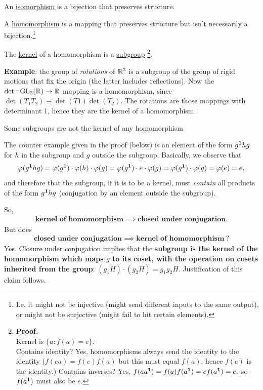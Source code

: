 An \underline{isomorphism} is a bijection that preserves structure.

A \underline{homomorphism} is a mapping that preserves structure but isn't
necessarily a bijection.\footnote{I.e. it might not be injective (might send
  different inputs to the same output), or might not be surjective (might fail
  to hit certain elements).}

\begin{theorem}
The \underline{kernel} of a homomorphism is a \underline{subgroup} \footnote{\textbf{Proof.}\\Kernel
  is $\{a:f(a) = e\}$.\\
Contains identity? Yes, homomorphisms always send the identity to the identity
($f(ea) = f(e)f(a)$ but this must equal $f(a)$, hence $f(e)$ is the identity.)
Contains inverses? Yes, $f(aa^{\mathbf 1}) = f(a)f(a^{\mathbf 1}) = ef(a^{\mathbf 1}) = e$, so $f(a^{\mathbf 1})$ must also be $e$.}.
\end{theorem}

\textbf{Example}: the group of \emph{rotations} of $\mathbb{R}^3$ is a subgroup of the
group of rigid motions that fix the origin (the latter includes
reflections). Now the $\det:\mathrm{GL}_{3}(\mathbb{R}) \to \mathbb{R}$ mapping is a homomorphism, since
$\det(T_1T_2) \equiv \det(T1)\det(T_2)$. The rotations are those mappings with
determinant 1, hence they are the kernel of a homomorphism.

\begin{theorem}
Some subgroups are not the kernel of any homomorphism
\end{theorem}

The counter example given in the proof (below) is an element of the form
$g^{\mathbf 1}hg$ for $h$ in the subgroup and $g$ outside the subgroup. Basically, we
observe that
\begin{align*}
\varphi(g^{\mathbf 1}hg) =
\varphi(g^{\mathbf 1})\cdot\varphi(h)\cdot \varphi(g) =
\varphi(g^{\mathbf 1})\cdot e\cdot\varphi(g) =
\varphi(g^{\mathbf 1})\cdot \varphi(g) =
\varphi(e) =
e,
\end{align*}
and therefore that the subgroup, if it is to be a kernel, must \emph{contain}
all products of the form $g^{\mathbf 1}hg$ (conjugation by an element outside the
subgroup).

So,
\begin{align*}
  \textbf{kernel of homomorphism} \implies \textbf{closed under conjugation}.
\end{align*}
But does
\begin{align*}
  \textbf{closed under conjugation} \implies \textbf{kernel of homomorphism} ~ ?
\end{align*}
Yes. Closure under conjugation implies that the \textbf{subgroup is the kernel
  of the homomorphism which maps $g$ to its coset, with the operation on cosets
  inherited from the group}: $(g_1H) \cdot (g_2H) = g_1g_2H$. Justification of
this claim follows.

